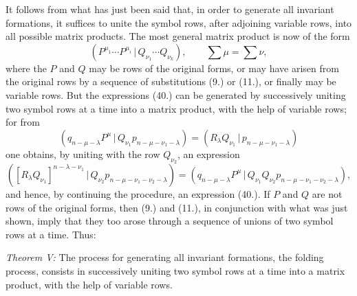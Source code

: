 \documentclass[11pt]{article}
\newcommand{\pair}[2]{(#1\,|\,#2)}
\begin{document}
It follows from what has just been said that, in order to generate all invariant formations, it suffices to unite the symbol rows, after adjoining variable rows, into all possible matrix products. The most general matrix product is now of the form
\begin{equation}
 \pair{P^{\mu_1}\cdots P^{\mu_i}}{Q_{\nu_1}\cdots Q_{\nu_k}},\qquad \sum\mu=\sum\nu,
\tag{40}
\end{equation}
where the $P$ and $Q$ may be rows of the original forms, or may have arisen from the original rows by a sequence of substitutions (9.) or (11.), or finally may be variable rows. But the expressions (40.) can be generated by successively uniting two symbol rows at a time into a matrix product, with the help of variable rows; for from
\[
 \pair{q_{n-\mu-\lambda}P^\mu}{Q_{\nu_1}p_{n-\mu-\nu_1-\lambda}}=\pair{R_\lambda Q_{\nu_1}}{p_{n-\mu-\nu_1-\lambda}}
\]
one obtains, by uniting with the row $Q_{\nu_2}$, an expression
\[
 \pair{[R_\lambda Q_{\nu_1}]^{n-\lambda-\nu_1}}{Q_{\nu_2}p_{n-\mu-\nu_1-\nu_2-\lambda}}
 =\pair{q_{n-\mu-\lambda}P^\mu}{Q_{\nu_1}Q_{\nu_2}p_{n-\mu-\nu_1-\nu_2-\lambda}},
\]
and hence, by continuing the procedure, an expression (40.). If $P$ and $Q$ are not rows of the original forms, then (9.) and (11.), in conjunction with what was just shown, imply that they too arose through a sequence of unions of two symbol rows at a time. Thus:

\emph{Theorem V:} The process for generating all invariant formations, the folding process, consists in successively uniting two symbol rows at a time into a matrix product, with the help of variable rows.
\end{document}

